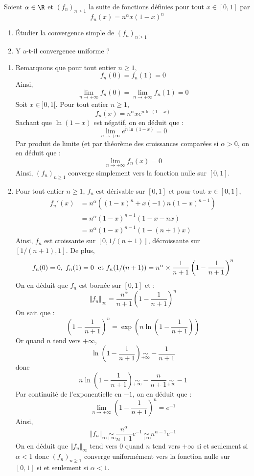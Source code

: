 \documentclass[a4paper,10pt]{report}
\begin{document}
\medskip


\begin{Exercice}{} Soient $\alpha \in \R$ et $(f_n)_{n \geq 1}$ la suite de fonctions définies pour tout $x \in [0,1]$ par 
$$f_n(x) = n^\alpha x(1-x)^n$$

\begin{enumerate}
 \item Étudier la convergence simple de $(f_n)_{n \geq 1}$.
 \item Y a-t-il convergence uniforme ?
  \end{enumerate}
\end{Exercice}

\newpage
\corr 

\begin{enumerate}
\item Remarquons que pour tout entier $n \geq 1$,
$$ f_n(0)=f_n(1)=0$$
Ainsi,
$$ \lim_{n \rightarrow + \infty} f_n(0) = \lim_{n \rightarrow + \infty} f_n(1) = 0$$
Soit $x \in ]0,1[$. Pour tout entier $n \geq 1$,
$$ f_n(x) = n^{\alpha} x e^{n \ln(1-x)}$$
Sachant que $\ln(1-x)$ est négatif, on en déduit que :
$$ \lim_{n \rightarrow + \infty}e^{n \ln(1-x)} = 0$$
Par produit de limite (et par théorème des croissances comparées si $\alpha>0$, on en déduit que :
$$ \lim_{n \rightarrow + \infty} f_n(x) = 0$$
Ainsi, $(f_n)_{n \geq 1}$ converge simplement vers la fonction nulle sur $[0,1]$.
\item Pour tout entier $n \geq 1$, $f_n$ est dérivable sur $[0,1]$ et pour tout $x \in [0,1]$,
\begin{align*}
 f_n'(x) & = n^{\alpha} ((1-x)^n + x (-1) n (1-x)^{n-1}) \\
 & = n^{\alpha} (1-x)^{n-1} (1-x-nx) \\
 & = n^{\alpha} (1-x)^{n-1} (1-(n+1)x) 
 \end{align*}
Ainsi, $f_n$ est croissante sur $[0, 1/(n+1)]$, décroissante sur $[1/(n+1), 1]$. De plus,
$$ f_n(0)=0, \; f_n(1)=0 \; \hbox{ et } f_n(1/(n+1)) =n^{\alpha} \times \dfrac{1}{n+1} \left(1- \dfrac{1}{n+1}\right)^{n}$$
On en déduit que $f_n$ est bornée sur $[0,1]$ et :
$$ \Vert f_n \Vert_{\infty} =   \dfrac{n^{\alpha}}{n+1} \left(1- \dfrac{1}{n+1}\right)^{n}$$
On sait que :
$$\left(1- \dfrac{1}{n+1}\right)^{n} = \exp \left(n \ln \left(1- \dfrac{1}{n+1}\right) \right) $$
Or quand $n$ tend vers $+ \infty$,
$$ \ln \left(1- \dfrac{1}{n+1}\right) \underset{+ \infty}{\sim} - \dfrac{1}{n+1}$$
donc 
$$ n \ln \left(1- \dfrac{1}{n+1}\right) \underset{+ \infty}{\sim} - \dfrac{n}{n+1} \underset{+ \infty}{\sim} -1$$
Par continuité de l'exponentielle en $-1$, on en déduit que :
$$ \lim_{n \rightarrow + \infty} \left(1- \dfrac{1}{n+1}\right)^{n} = e^{-1}$$
Ainsi,
$$  \Vert f_n \Vert_{\infty} \underset{+ \infty}{\sim} \dfrac{n^{\alpha}}{n+1} e^{-1} \underset{+ \infty}{\sim} n^{\alpha-1} e^{-1}$$
On en déduit que $\Vert f_n \Vert_{\infty}$ tend vers $0$ quand $n$ tend vers $+ \infty$ si et seulement si $\alpha<1$ donc $(f_n)_{n \geq 1}$ converge uniformément vers la fonction nulle sur $[0,1]$ si et seulement si $\alpha<1$.
\end{enumerate}
\end{document}
